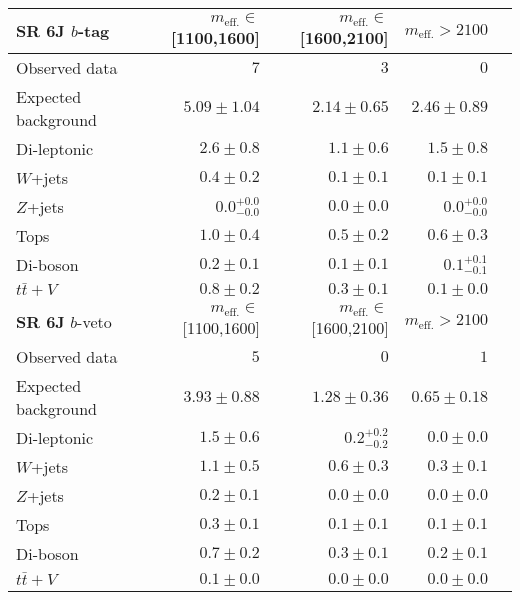 \begin{tabular*}{\textwidth}{@{\extracolsep{\fill}}lrrrr}
\toprule
\textbf{SR 6J} $b$-tag &  $m_{\mathrm{eff.}}\in$[1100,1600] & $m_{\mathrm{eff.}}\in$[1600,2100] & $m_{\mathrm{eff.}}>2100$ \\
\midrule

Observed data          & $7$              & $3$              & $0$                    \\
\midrule
Expected background         & $5.09 \pm 1.04$          & $2.14 \pm 0.65$          & $2.46 \pm 0.89$              \\
\midrule
        Di-leptonic         & $2.6 \pm 0.8$          & $1.1 \pm 0.6$          & $1.5 \pm 0.8$              \\
        $W$+jets         & $0.4 \pm 0.2$          & $0.1 \pm 0.1$          & $0.1 \pm 0.1$              \\
        $Z$+jets         & $0.0_{-0.0}^{+0.0}$          & $0.0 \pm 0.0$          & $0.0_{-0.0}^{+0.0}$              \\
        Tops         & $1.0 \pm 0.4$          & $0.5 \pm 0.2$          & $0.6 \pm 0.3$              \\
        Di-boson         & $0.2 \pm 0.1$          & $0.1 \pm 0.1$          & $0.1_{-0.1}^{+0.1}$              \\
        $t\bar{t}+V$         & $0.8 \pm 0.2$          & $0.3 \pm 0.1$          & $0.1 \pm 0.0$              \\
\toprule
\textbf{SR 6J} $b$-veto &  $m_{\mathrm{eff.}}\in$[1100,1600] & $m_{\mathrm{eff.}}\in$[1600,2100] & $m_{\mathrm{eff.}}>2100$ \\
\midrule
Observed data          & $5$              & $0$              & $1$                    \\
\midrule
Expected background         & $3.93 \pm 0.88$          & $1.28 \pm 0.36$          & $0.65 \pm 0.18$              \\
\midrule
        Di-leptonic         & $1.5 \pm 0.6$          & $0.2_{-0.2}^{+0.2}$          & $0.0 \pm 0.0$              \\
        $W$+jets         & $1.1 \pm 0.5$          & $0.6 \pm 0.3$          & $0.3 \pm 0.1$              \\
        $Z$+jets         & $0.2 \pm 0.1$          & $0.0 \pm 0.0$          & $0.0 \pm 0.0$              \\
        Tops         & $0.3 \pm 0.1$          & $0.1 \pm 0.1$          & $0.1 \pm 0.1$              \\
        Di-boson         & $0.7 \pm 0.2$          & $0.3 \pm 0.1$          & $0.2 \pm 0.1$              \\
        $t\bar{t}+V$         & $0.1 \pm 0.0$          & $0.0 \pm 0.0$          & $0.0 \pm 0.0$              \\


\bottomrule
\end{tabular*}




